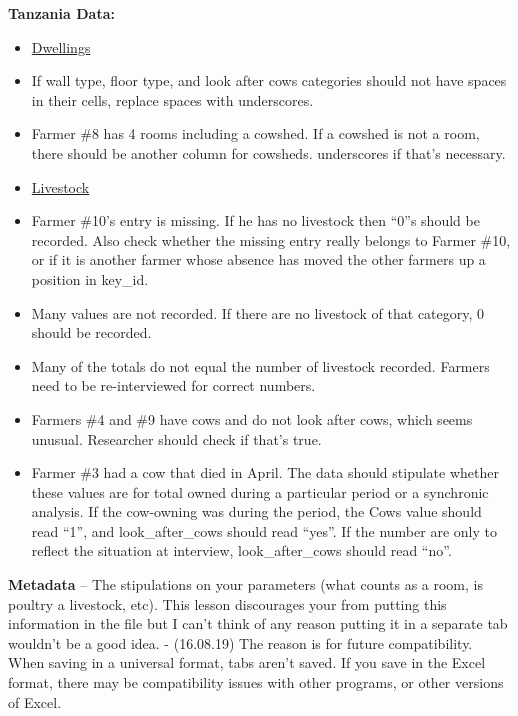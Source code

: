 \documentclass[12pt]{article}
\begin{document}
\textbf{{Tanzania Data:}}
\begin{itemize}
\renewcommand{\labelitemi}{}
    \item \underline{Dwellings}
\renewcommand{\labelitemi}{$\bullet$}
    \item If wall type, floor type, and look after cows categories should not have spaces in their cells, replace spaces with underscores.
    \item Farmer \#8 has 4 rooms including a cowshed. If a cowshed is not a room, there should be another column for cowsheds. underscores if that’s necessary.
\renewcommand{\labelitemi}{}
    \item \underline{Livestock}
\renewcommand{\labelitemi}{$\bullet$}
    \item Farmer \#10’s entry is missing. If he has no livestock then “0”s should be recorded. Also check whether the missing entry really belongs to Farmer \#10, or if it is another farmer whose absence has moved the other farmers up a position in key\_id.
    \item Many values are not recorded. If there are no livestock of that category, 0 should be recorded.
    \item Many of the totals do not equal the number of livestock recorded. Farmers need to be re-interviewed for correct numbers.
    \item Farmers \#4 and \#9 have cows and do not look after cows, which seems unusual. Researcher should check if that’s true.
    \item Farmer \#3 had a cow that died in April. The data should stipulate whether these values are for total owned during a particular period or a synchronic analysis. If the cow-owning was during the period, the Cows value should read “1”, and look\_after\_cows should read “yes”. If the number are only to reflect the situation at interview, look\_after\_cows should read “no”.
\end{itemize}

\textbf{Metadata} – The stipulations on your parameters (what counts as a room, is poultry a livestock, etc). This lesson discourages your from putting this information in the file but I can’t think of any reason putting it in a separate tab wouldn’t be a good idea. \color{teal}\small{- (16.08.19) The reason is for future compatibility. When saving in a universal format, tabs aren't saved. If you save in the Excel format, there may be compatibility issues with other programs, or other versions of Excel.}
\end{document}
